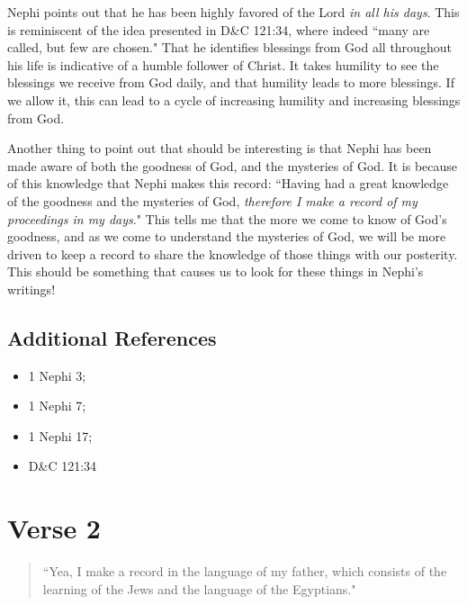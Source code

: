 \documentclass[12pt]{report}
\begin{document}
Nephi points out that he has been highly favored of the Lord \emph{in all his days}.  This is reminiscent of the idea presented in D\&C 121:34, where indeed ``many are called, but few are chosen."  That he identifies blessings from God all throughout his life is indicative of a humble follower of Christ.  It takes humility to see the blessings we receive from God daily, and that humility leads to more blessings.  If we allow it, this can lead to a cycle of increasing humility and increasing blessings from God.

Another thing to point out that should be interesting is that Nephi has been made aware of both the goodness of God, and the mysteries of God.  It is because of this knowledge that Nephi makes this record: ``Having had a great knowledge of the goodness and the mysteries of God, \emph{therefore I make a record of my proceedings in my days}."  This tells me that the more we come to know of God's goodness, and as we come to understand the mysteries of God, we will be more driven to keep a record to share the knowledge of those things with our posterity.  This should be something that causes us to look for these things in Nephi's writings!
\subsection{Additional References\label{1Nephi1:1:references}}
\begin{itemize}
\item 1 Nephi 3; 
\item 1 Nephi 7; 
\item 1 Nephi 17; 
\item D\&C 121:34
\end{itemize}

\section{Verse 2\label{1Nephi1:2}}
\begin{center}
\begin{quote}
``Yea, I make a record in the language of my father, which consists of the learning of the Jews and the language of the Egyptians."
\end{quote}
\end{center}
\end{document}
